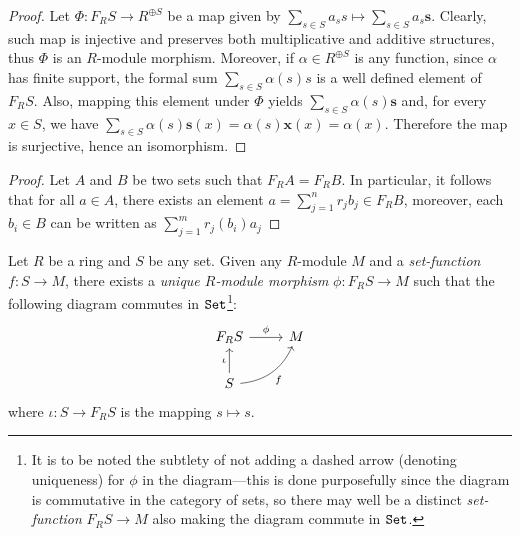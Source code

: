 \begin{proof}
Let \(\Phi: F_R S \to R^{\oplus S}\) be a map given by
\(\sum_{s \in S} a_s s \mapsto \sum_{s \in S} a_s \mathbf{s}\). Clearly, such
map is injective and preserves both multiplicative and additive structures, thus
\(\Phi\) is an \(R\)-module morphism. Moreover, if \(\alpha \in R^{\oplus S}\)
is any function, since \(\alpha\) has finite support, the formal sum
\(\sum_{s \in S} \alpha(s) s\) is a well defined element of \(F_R S\). Also,
mapping this element under \(\Phi\) yields
\(\sum_{s \in S} \alpha(s) \mathbf{s}\) and, for every \(x \in S\), we have
\(\sum_{s \in S} \alpha(s) \mathbf{s}(x) = \alpha(s) \mathbf{x}(x) =
\alpha(x)\). Therefore the map is surjective, hence an isomorphism.
\end{proof}

\begin{proof}
Let \(A\) and \(B\) be two sets such that \(F_R A = F_R B\). In particular, it
follows that for all \(a \in A\), there exists an element \(a = \sum_{j=1}^n r_j
b_j \in F_R B\), moreover, each \(b_i \in B\) can be written as \(\sum_{j=1}^m
r_j(b_i) a_j\)
\end{proof}

\begin{proposition}
\label{prop:free-mod-univ-prop}
Let \(R\) be a ring and \(S\) be any set. Given any \(R\)-module \(M\) and a
\emph{set-function} \(f: S \to M\), there exists a \emph{unique \(R\)-module
  morphism} \(\phi: F_R S \to M\) such that the following diagram commutes in
\({\texttt{Set}}\)\footnote{It is to be noted the subtlety of not adding a dashed arrow
  (denoting uniqueness) for \(\phi\) in the diagram---this is done purposefully
  since the diagram is commutative in the category of sets, so there may well be
  a distinct \emph{set-function} \(F_R S \to M\) also making the diagram commute
  in \({\texttt{Set}}\).}:
\[
\begin{tikzcd}
F_R S \ar[r, "\phi"] &M \\
S \ar[u, "\iota"] \ar[ru, "f"', bend right] &
\end{tikzcd}
\]
where \(\iota: S \to F_R S\) is the mapping \(s \mapsto s\).
\end{proposition}

